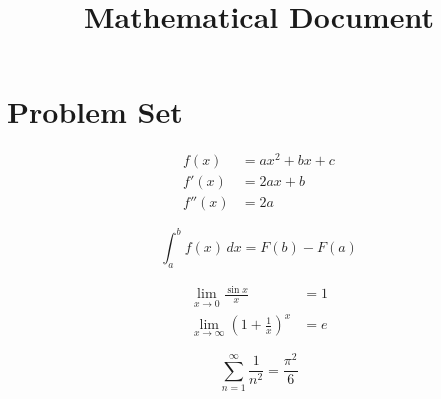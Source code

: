 \documentclass[12pt]{article}
\title{Mathematical Document}
\author{}
\date{}
\begin{document}
\maketitle

\section*{Problem Set}


\begin{align}
    f(x) &= ax^2 + bx + c \\
    f'(x) &= 2ax + b \\
    f''(x) &= 2a
\end{align}

\begin{equation}
    \int_{a}^{b} f(x) \, dx = F(b) - F(a)
\end{equation}

\begin{align}
    \lim_{x \to 0} \frac{\sin x}{x} &= 1 \\
    \lim_{x \to \infty} \left(1 + \frac{1}{x}\right)^x &= e
\end{align}

\begin{equation}
    \sum_{n=1}^{\infty} \frac{1}{n^2} = \frac{\pi^2}{6}
\end{equation}

\newpage

\end{document}
